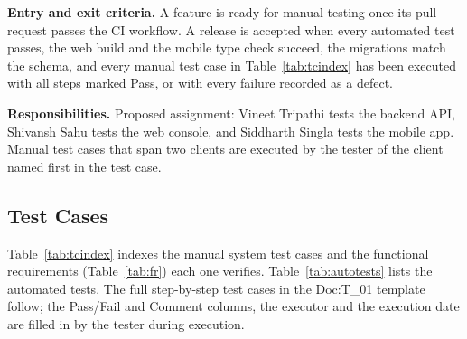 \documentclass[11pt,a4paper]{article}
\begin{document}
\textbf{Entry and exit criteria.} A feature is ready for manual testing once its
pull request passes the CI workflow. A release is accepted when every
automated test passes, the web build and the mobile type check succeed, the
migrations match the schema, and every manual test case in
Table~\ref{tab:tcindex} has been executed with all steps marked Pass, or with
every failure recorded as a defect.

\textbf{Responsibilities.} %
Proposed assignment: Vineet Tripathi tests
the backend API, Shivansh Sahu tests the web console, and Siddharth Singla tests
the mobile app. Manual test cases that span two clients are executed by the
tester of the client named first in the test case.

\subsection{Test Cases}

Table~\ref{tab:tcindex} indexes the manual system test cases and the functional
requirements (Table~\ref{tab:fr}) each one verifies. Table~\ref{tab:autotests}
lists the automated tests. The full step-by-step test cases in the Doc:T\_01
template follow; the Pass/Fail and Comment columns, the executor and the
execution date are filled in by the tester during execution.
\end{document}
